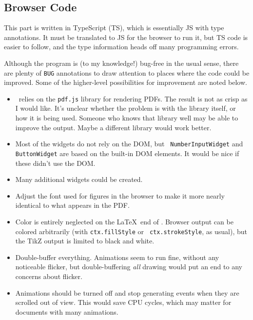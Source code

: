\documentclass[10pt]{article}
\begin{document}
\subsection{Browser Code}

This part is written in TypeScript (TS), which is essentially JS with
type annotations. It must be translated 
to JS for the browser to run it, but TS code is easier to follow, and
the type information heads off many programming errors.

Although the program is (to my knowledge!) bug-free in the usual
sense, there are plenty of {\tt BUG} annotations to draw attention to
places where the code could be improved. Some of the higher-level
possibilities for improvement are noted below.
\begin{itemize}[itemsep=-1pt,leftmargin=*]
\item \figput\ relies on the {\tt pdf.js} library for rendering
  PDFs. The result is not as crisp as I would like. It's unclear
  whether the problem is with the library itself, or how it is being
  used. Someone who knows that library well may be able to improve the
  output. Maybe a different library would work better.
\item Most of the widgets do not rely on the DOM, but {\tt
  NumberInputWidget} and {\tt ButtonWidget} are based on the built-in
  DOM elements. It would be nice if these didn't use the DOM.
\item Many additional widgets could be created.
\item Adjust the font used for figures in the browser to make it more
  nearly identical to what appears in the PDF. 
\item Color is entirely neglected on the \LaTeX\ end of \figput. Browser output
  can be colored arbitrarily (with {\tt ctx.fillStyle} or {\tt
    ctx.strokeStyle}, as usual), but the TikZ output is limited to
  black and white. 
\item Double-buffer everything. Animations seem to run fine,
  without any noticeable flicker, but double-buffering \emph{all}
  drawing would put an end to any concerns about flicker.
\item Animations should be turned off and stop generating events when
  they are scrolled out of view. This would save CPU cycles, which may
  matter for documents with many animations.
\end{itemize}
\end{document}
